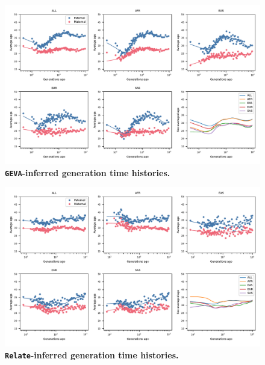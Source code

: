 \documentclass[]{article}
\newcommand{\GEVA}{\texttt{GEVA}\xspace}
\newcommand{\relate}{\texttt{Relate}\xspace}
\begin{document}
\begin{figure}[ht!]
    \centering
    \includegraphics[width=\textwidth]{../plots/inferred_generation_times.DM.geva.max_age.10000.pdf}
    \caption{
        \textbf{\GEVA-inferred generation time histories.}
    }
    \label{fig:geva-gen-times}
\end{figure}

\begin{figure}[ht!]
    \centering
    \includegraphics[width=\textwidth]{../plots/inferred_generation_times.DM.relate.max_age.10000.pdf}
    \caption{
        \textbf{\relate-inferred generation time histories.}
    }
    \label{fig:relate-gen-times}
\end{figure}
\end{document}
